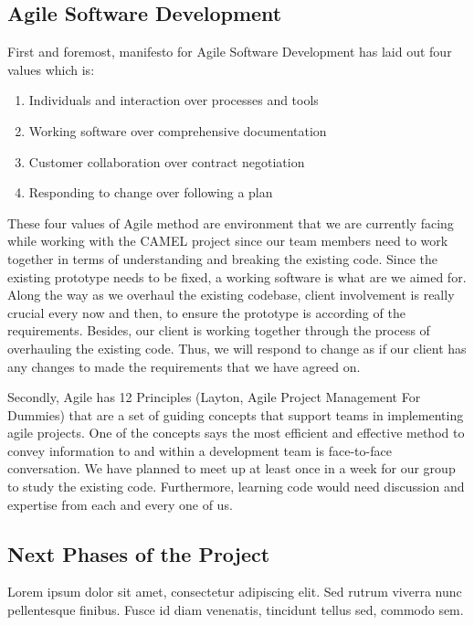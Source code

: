 \subsection*{Agile Software Development}
First and foremost, manifesto for Agile Software Development has laid out four values which is:

\begin{enumerate}[label=(\roman*)] %
\item Individuals and interaction over processes and tools
\item Working software over comprehensive documentation
\item Customer collaboration over contract negotiation
\item Responding to change over following a plan 
\end{enumerate}

These four values of Agile method are environment that we are currently facing while working with the CAMEL project since our team members need to work together in terms of understanding and breaking the existing code. Since the existing prototype needs to be fixed, a working software is what are we aimed for. Along the way as we overhaul the existing codebase, client involvement is really crucial every now and then, to ensure the prototype is according of the requirements. Besides, our client is working together through the process of overhauling the existing code. Thus, we will respond to change as if our client has any changes to made the requirements that we have agreed on.  

	Secondly, Agile has 12 Principles (Layton, Agile Project Management For Dummies) that are a set of guiding concepts that support teams in implementing agile projects. One of the concepts says the most efficient and effective method to convey information to and within a development team is face-to-face conversation. We have planned to meet up at least once in a week for our group to study the existing code. Furthermore, learning code would need discussion and expertise from each and every one of us. 

\subsection*{Next Phases of the Project}
Lorem ipsum dolor sit amet, consectetur adipiscing elit. Sed rutrum viverra nunc pellentesque finibus. Fusce id diam venenatis, tincidunt tellus sed, commodo sem.


